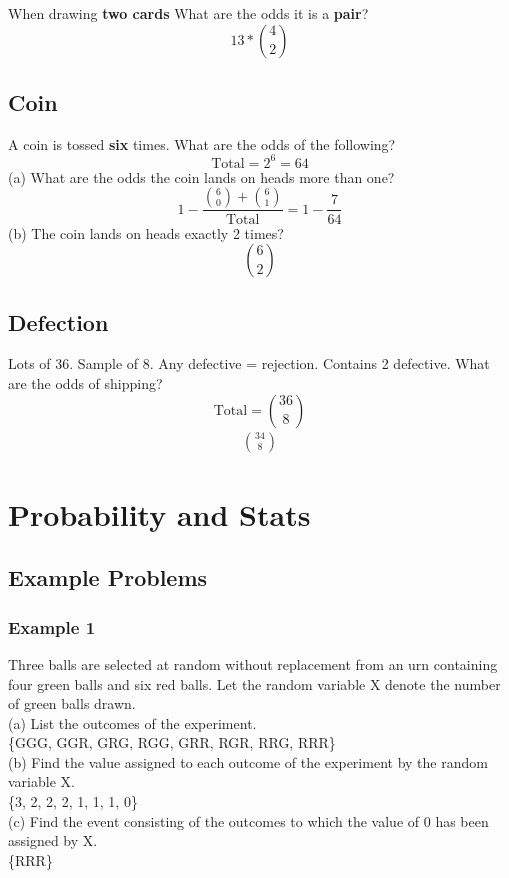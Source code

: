 \documentclass[twocolumn]{article}
\newcommand{\bd}{\textbf}
\begin{document}
	\noindent When drawing \bd{two cards} What are the odds it is a \bd{pair}?
	\begin{equation*}
		13 * {4 \choose 2}
	\end{equation*}
	
	\subsection*{Coin}
	\par A coin is tossed \bd{six} times. What are the odds of the following?
	\begin{equation*}
		\text{Total} = 2^6 = 64
	\end{equation*}
	(a) What are the odds the coin lands on heads more than one?
	\begin{equation*}
		1 - \frac{{6 \choose 0} + {6 \choose 1}}{\text{Total}} = 1 - \frac{7}{64}
	\end{equation*}
	(b) The coin lands on heads exactly 2 times?
	\begin{equation*}
		{6 \choose 2}
	\end{equation*}
	
	\subsection*{Defection}
	\par Lots of 36. Sample of 8. Any defective = rejection. Contains 2 defective. What are the odds of shipping?
	\begin{equation*}
		\text{Total} = {36 \choose 8}
	\end{equation*}
	\begin{align*}
		34 \choose 8
	\end{align*}
	\section{Probability and Stats}
	\maketitle{}
	
	\subsection*{Example Problems}
	\subsubsection*{Example 1}
	Three balls are selected at random without replacement from an urn containing four green balls and six red balls. Let the random variable X denote the number of green balls drawn. \\
	(a) List the outcomes of the experiment. \\
	\indent \{GGG, GGR, GRG, RGG, GRR, RGR, RRG, RRR\} \\
	(b) Find the value assigned to each outcome of the experiment by the random variable X. \\
	\indent \{3, 2, 2, 2, 1, 1, 1, 0\} \\
	(c) Find the event consisting of the outcomes to which the value of 0 has been assigned by X. \\
	\indent \{RRR\}
	
\end{document}
